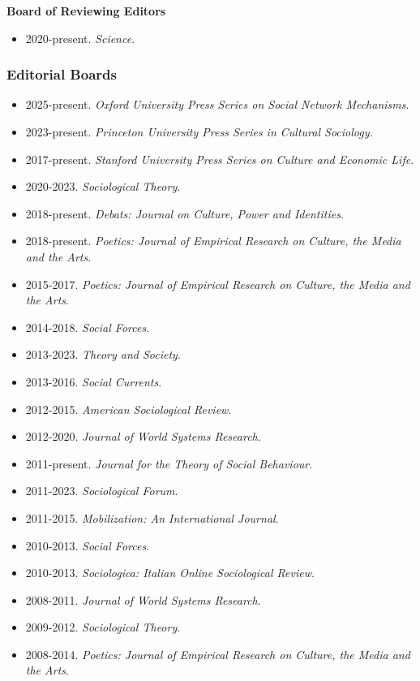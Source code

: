 \documentclass[
]{article}
\providecommand{\tightlist}{%
  \setlength{\itemsep}{0pt}\setlength{\parskip}{0pt}}
\begin{document}
\textbf{Board of Reviewing Editors}

\begin{itemize}
\tightlist
\item
  2020-present. \emph{Science}.
\end{itemize}

\subsubsection{Editorial Boards}\label{editorial-boards}

\begin{itemize}
\tightlist
\item
  2025-present. \emph{Oxford University Press Series on Social Network
  Mechanisms}.
\item
  2023-present. \emph{Princeton University Press Series in Cultural
  Sociology.}
\item
  2017-present. \emph{Stanford University Press Series on Culture and
  Economic Life.}
\item
  2020-2023. \emph{Sociological Theory}.
\item
  2018-present. \emph{Debats: Journal on Culture, Power and Identities}.
\item
  2018-present. \emph{Poetics: Journal of Empirical Research on Culture,
  the Media and the Arts}.
\item
  2015-2017. \emph{Poetics: Journal of Empirical Research on Culture,
  the Media and the Arts}.
\item
  2014-2018. \emph{Social Forces}.
\item
  2013-2023. \emph{Theory and Society}.
\item
  2013-2016. \emph{Social Currents}.
\item
  2012-2015. \emph{American Sociological Review}.
\item
  2012-2020. \emph{Journal of World Systems Research}.
\item
  2011-present. \emph{Journal for the Theory of Social Behaviour}.
\item
  2011-2023. \emph{Sociological Forum}.
\item
  2011-2015. \emph{Mobilization: An International Journal}.
\item
  2010-2013. \emph{Social Forces}.
\item
  2010-2013. \emph{Sociologica: Italian Online Sociological Review}.
\item
  2008-2011. \emph{Journal of World Systems Research}.
\item
  2009-2012. \emph{Sociological Theory}.
\item
  2008-2014. \emph{Poetics: Journal of Empirical Research on Culture,
  the Media and the Arts}.
\end{itemize}
\end{document}
